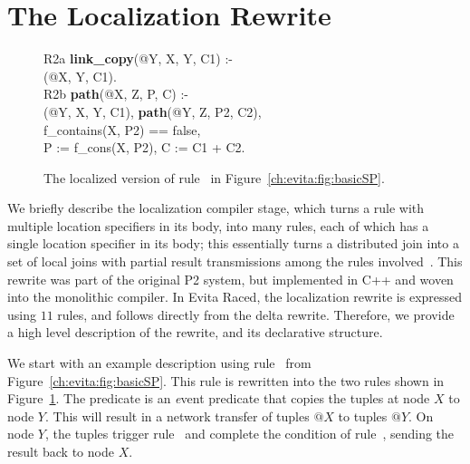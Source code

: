 \section{The Localization Rewrite}
\label{ch:evita:sec:local}

\begin{figure}[!t]
\ssp
\centering
\begin{boxedminipage}{\linewidth}
R2a {\bf link\_copy}(@Y, X, Y, C1) :- \\
(@X, Y, C1). \\

R2b {\bf path}(@X, Z, P, C) :- \\
(@Y, X, Y, C1), {\bf path}(@Y, Z, P2, C2),\\
\datalogspace f\_contains(X, P2) == false, \\
\datalogspace P := f\_cons(X, P2), C := C1 + C2. \\

\end{boxedminipage}
\caption{\label{ch:evita:fig:basicSPLocal}The localized version of rule~ in
Figure~\ref{ch:evita:fig:basicSP}.}
\end{figure}

We briefly describe the localization compiler stage, which turns a rule with
multiple location specifiers in its body, into many rules, each of which has a
single location specifier in its body; this essentially turns a distributed
join into a set of local joins with partial result transmissions among the
rules involved~\cite{loo-sigmod06}.  This rewrite was part of the original P2
system, but implemented in C++ and woven into the monolithic compiler.  In
Evita Raced, the localization rewrite is expressed using $11$ rules, and
follows directly from the delta rewrite. Therefore, we provide a high level
description of the rewrite, and its declarative structure.

We start with an example description using rule~ from
Figure~\ref{ch:evita:fig:basicSP}.  This rule is rewritten into the two rules
shown in Figure~\ref{ch:evita:fig:basicSPLocal}.  The  predicate
is an {\emph event} predicate that copies the  tuples at node $X$ to
node $Y$.  This will result in a network transfer of  tuples $@X$ to
 tuples $@Y$.  On node $Y$, the  tuples trigger
rule~ and complete the condition of rule~, sending the result
back to node $X$.

